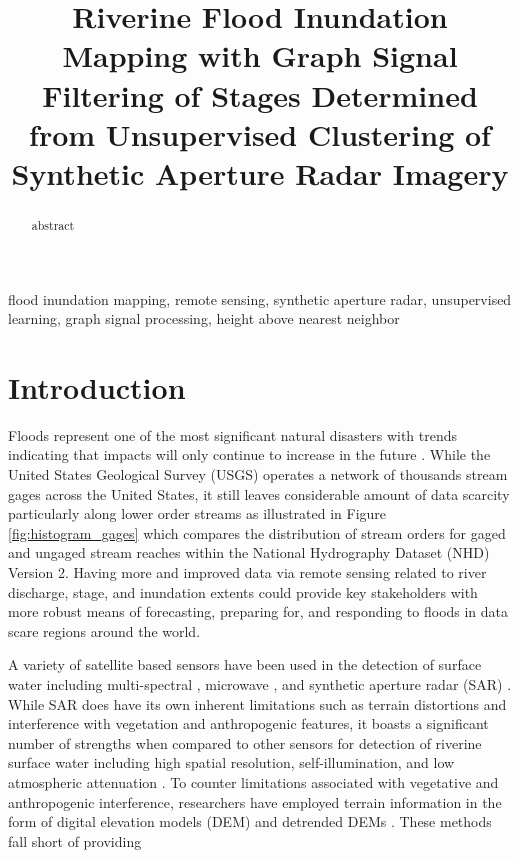 \documentclass{article}
\title{Riverine Flood Inundation Mapping with Graph Signal Filtering of Stages Determined from Unsupervised Clustering of Synthetic Aperture Radar Imagery}
\begin{document}
%
\maketitle
%
\begin{abstract}
abstract
\end{abstract}
%
\begin{keywords}
flood inundation mapping, remote sensing, synthetic aperture radar, unsupervised learning, graph signal processing, height above nearest neighbor 
\end{keywords}
%
\section{Introduction}
\label{sec:intro}

Floods represent one of the most significant natural disasters \cite{national_weather_service_2020,national_weather_service_2019,national_weather_service_2018,us_department_of_commerce_2020} with trends indicating that impacts will only continue to increase in the future \cite{mallakpour2015changing,downton2005reanalysis,kunkel1999temporal,pielke2000precipitation,corringham2019effect,tabari2020climate,milly2002increasing,wing2018estimates}. 
While the United States Geological Survey (USGS) operates a network of thousands stream gages across the United States, it still leaves considerable amount of data scarcity particularly along lower order streams as illustrated in Figure \ref{fig:histogram_gages} which compares the distribution of stream orders for gaged and ungaged stream reaches within the National Hydrography Dataset (NHD) Version 2.
Having more and improved data via remote sensing related to river discharge, stage, and inundation extents could provide key stakeholders with more robust means of forecasting, preparing for, and responding to floods in data scare regions around the world.

A variety of satellite based sensors have been used in the detection of surface water including multi-spectral \cite{nigro2014nasa,sanyal2004application,wang2004using,brakenridge2006modis,jain2005delineation,nghiem2000flood,hussain2011mapping,frazier2000water,dewan2006flood,brivio2002integration}, microwave \cite{de2015global,schumann2015microwave,de2010flood,bindlish2008role,de2009global,kundu2015flood}, and synthetic aperture radar (SAR) \cite{aristizabal2020high,shastry2019using,martinis2010automatic,kudahetty2012flood,schlaffer2015flood,chini2019sentinel,chaabani2018flood,huang2018automated,saatchi2019sar,kasischke2003effects,hess2003dual}.
While SAR does have its own inherent limitations such as terrain distortions and interference with vegetation and anthropogenic features, it boasts a significant number of strengths when compared to other sensors for detection of riverine surface water including high spatial resolution, self-illumination, and low atmospheric attenuation \cite{saatchi2019sar,muckenhuber2016open}.
To counter limitations associated with vegetative and anthropogenic interference, researchers have employed terrain information in the form of digital elevation models (DEM) and detrended DEMs \cite{townsend1998modeling,aristizabal2020high,shastry2019using,saatchi2019sar,twele2016sentinel,huang2017comparison}.
These methods fall short of providing
\end{document}
